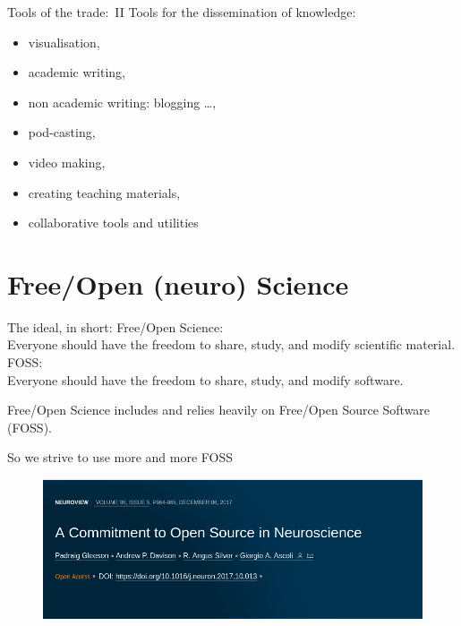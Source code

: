 \begin{frame}[c]{Tools of the trade:\ II}
	\textcolor{FedoraDarkBlue}{Tools for the dissemination of knowledge\footnotemark[4]:}
	\begin{itemize}
		\item visualisation,
		\item academic writing,
		\item non academic writing: blogging \ldots,
		\item pod-casting,
		\item video making,
		\item creating teaching materials,
		\item collaborative tools and utilities
	\end{itemize}
\end{frame}

\section{Free/Open (neuro) Science}
\begin{frame}[c]{The ideal, in short:}
	Free/Open Science:\\\alert{Everyone} should have the freedom to \alert{share, study, and modify} scientific material.\\
	
	\vspace{0.5cm}
	FOSS\@:\\\alert{Everyone} should have the freedom to \alert{share, study, and modify} software\footnotemark[5].\\
	
	\vspace{0.5cm}
	\alert{Free/Open Science includes and relies heavily on Free/Open Source Software (FOSS).}
\end{frame}

\begin{frame}[c]{So we strive to use more and more FOSS}
	\begin{figure}[htpb]
		\centering
		\includegraphics[width=\linewidth]{images/open-source-paper.png}
	\end{figure}
\end{frame}

